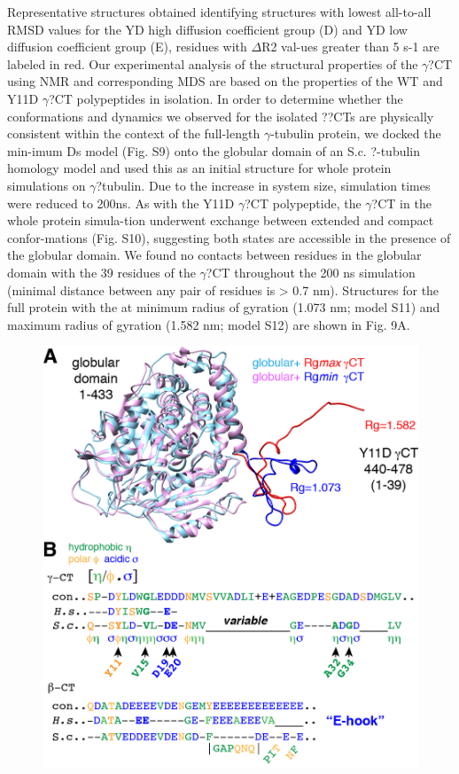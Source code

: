 Representative structures obtained identifying structures with lowest all-to-all RMSD values for the YD high diffusion coefficient group (D) and YD low diffusion coefficient group (E), residues with $\Delta$R2 val-ues greater than 5 s-1 are labeled in red.
	Our experimental analysis of the structural properties of the $\gamma$?CT using NMR and corresponding MDS are based on the properties of the WT and Y11D $\gamma$?CT polypeptides in isolation. In order to determine whether the conformations and dynamics we observed for the isolated ??CTs are physically consistent within the context of the full-length $\gamma$-tubulin protein, we docked the min-imum Ds \gct model (Fig. S9) onto the globular domain of an S.c. ?-tubulin homology model and used this as an initial structure for whole protein simulations on $\gamma$?tubulin. Due to the increase in system size, simulation times were reduced to 200ns.  As with the Y11D $\gamma$?CT polypeptide, the $\gamma$?CT in the whole protein simula-tion underwent exchange between extended and compact confor-mations (Fig. S10), suggesting both states are accessible in the presence of the globular domain. We found no contacts between residues in the globular domain with the 39 residues of the $\gamma$?CT throughout the 200 ns simulation (minimal distance between any pair of residues is > 0.7 nm). Structures for the full protein with the \gct at minimum radius of gyration (1.073 nm; model S11) and maximum radius of gyration (1.582 nm; model S12) are shown in Fig. 9A.

\begin{figure}
\includegraphics{figures/Figure_9.png}
\end{figure}

